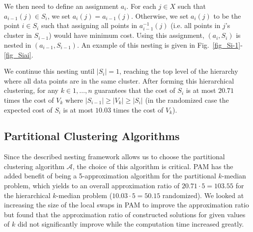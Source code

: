 \documentclass[conference, 10pt, final]{IEEEtran}
\begin{document}
We then need to define an assignment $a_i$. For each $j \in X$ such that $a_{i-1}(j) \in S_{i}$, we set $a_i(j) = a_{i-1}(j)$. Otherwise, we set $a_i(j)$ to be the point $i \in S_i$ such that assigning all points in $a_{i-1}^{-1}(j)$ (i.e. all points in $j$'s cluster in $S_{i-1}$) would have minimum cost. Using this assignment, $(a_i, S_i)$ is nested in $(a_{i-1}, S_{i-1})$. An example of this nesting is given in Fig.~\ref{fig_Si-1}-\ref{fig_Siai}.

We continue this nesting until $|S_i| = 1$, reaching the top level of the hierarchy where all data points are in the same cluster. After forming this hierarchical clustering, for any $k \in 1, \ldots, n$ \cite{Lin} guarantees that the cost of $S_i$ is at most $20.71$ times the cost of $V_k$ where $|S_{i-1}| \geq |V_k| \geq |S_{i}|$ (in the randomized case the expected cost of $S_i$ is at most $10.03$ times the cost of $V_k$).


\subsection{Partitional Clustering Algorithms}
Since the described nesting framework allows us to choose the partitional clustering algorithm $\mathcal{A}$, the choice of this algorithm is critical. PAM has the added benefit of being a 5-approximation algorithm for the partitional $k$-median problem, which yields to an overall approximation ratio of $20.71 \cdot 5 = 103.55$ for the hierarchical $k$-median problem ($10.03 \cdot 5 = 50.15$ randomized). We looked at increasing the size of the local swaps in PAM to improve the approximation ratio but found that the approximation ratio of constructed solutions for given values of $k$ did not significantly improve while the computation time increased greatly. 
\end{document}
